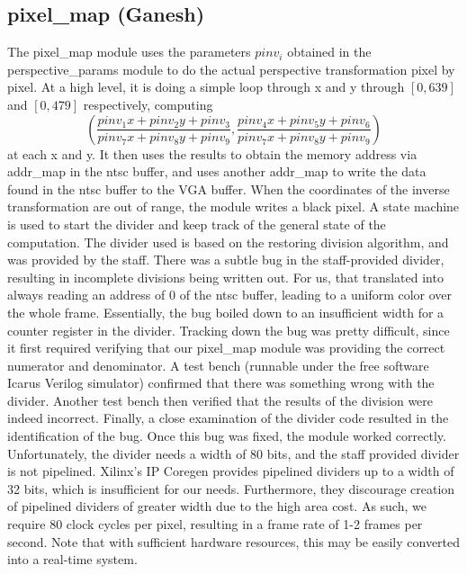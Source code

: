 \documentclass{article}
\begin{document}
\subsection{pixel\_map (Ganesh)}
The pixel\_map module uses the parameters $pinv_i$ obtained in the perspective\_params module to do the actual perspective transformation pixel by pixel.
At a high level, it is doing a simple loop through x and y through $[0, 639]$ and $[0, 479]$ respectively, computing
\begin{equation*}
    \left( \frac{pinv_1 x + pinv_2 y + pinv_3}{pinv_7 x + pinv_8 y + pinv_9}, \frac{pinv_4 x + pinv_5 y + pinv_6}{pinv_7 x + pinv_8 y + pinv_9} \right)
\end{equation*}
at each x and y.
It then uses the results to obtain the memory address via addr\_map in the ntsc buffer,
and uses another addr\_map to write the data found in the ntsc buffer to the VGA buffer.
When the coordinates of the inverse transformation are out of range,
the module writes a black pixel.
A state machine is used to start the divider and keep track of the general state of the computation.
The divider used is based on the restoring division algorithm,
and was provided by the staff.
There was a subtle bug in the staff-provided divider, resulting in incomplete divisions being written out.
For us, that translated into always reading an address of $0$ of the ntsc buffer,
leading to a uniform color over the whole frame.
Essentially, the bug boiled down to an insufficient width for a counter register in the divider.
Tracking down the bug was pretty difficult,
since it first required verifying that our pixel\_map module was providing the correct numerator and denominator.
A test bench (runnable under the free software Icarus Verilog simulator) confirmed that there was something wrong with the divider.
Another test bench then verified that the results of the division were indeed incorrect.
Finally, a close examination of the divider code resulted in the identification of the bug.
Once this bug was fixed, the module worked correctly.
Unfortunately, the divider needs a width of 80 bits, and the staff provided divider is not pipelined.
Xilinx's IP Coregen provides pipelined dividers up to a width of 32 bits, which is insufficient for our needs.
Furthermore, they discourage creation of pipelined dividers of greater width due to the high area cost.
As such, we require 80 clock cycles per pixel, resulting in a frame rate of 1-2 frames per second.
Note that with sufficient hardware resources, this may be easily converted into a real-time system.
\end{document}

